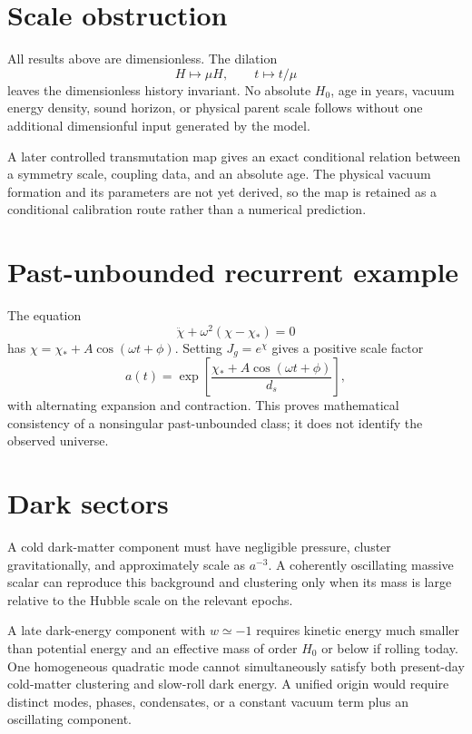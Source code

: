\documentclass[11pt,a4paper]{article}
\begin{document}
\section{Scale obstruction}
All results above are dimensionless. The dilation
\begin{equation}
H\mapsto\mu H,\qquad t\mapsto t/\mu
\end{equation}
leaves the dimensionless history invariant. No absolute $H_0$, age in years, vacuum energy density, sound horizon, or physical parent scale follows without one additional dimensionful input generated by the model.

A later controlled transmutation map gives an exact conditional relation between a symmetry scale, coupling data, and an absolute age. The physical vacuum formation and its parameters are not yet derived, so the map is retained as a conditional calibration route rather than a numerical prediction.

\section{Past-unbounded recurrent example}
The equation
\begin{equation}
\ddot\chi+\omega^2(\chi-\chi_*)=0
\end{equation}
has $\chi=\chi_*+A\cos(\omega t+\phi)$. Setting $J_g=e^\chi$ gives a positive scale factor
\begin{equation}
a(t)=\exp\left[\frac{\chi_*+A\cos(\omega t+\phi)}{d_s}\right],
\end{equation}
with alternating expansion and contraction. This proves mathematical consistency of a nonsingular past-unbounded class; it does not identify the observed universe.

\section{Dark sectors}
A cold dark-matter component must have negligible pressure, cluster gravitationally, and approximately scale as $a^{-3}$. A coherently oscillating massive scalar can reproduce this background and clustering only when its mass is large relative to the Hubble scale on the relevant epochs.

A late dark-energy component with $w\simeq-1$ requires kinetic energy much smaller than potential energy and an effective mass of order $H_0$ or below if rolling today. One homogeneous quadratic mode cannot simultaneously satisfy both present-day cold-matter clustering and slow-roll dark energy. A unified origin would require distinct modes, phases, condensates, or a constant vacuum term plus an oscillating component.
\end{document}
